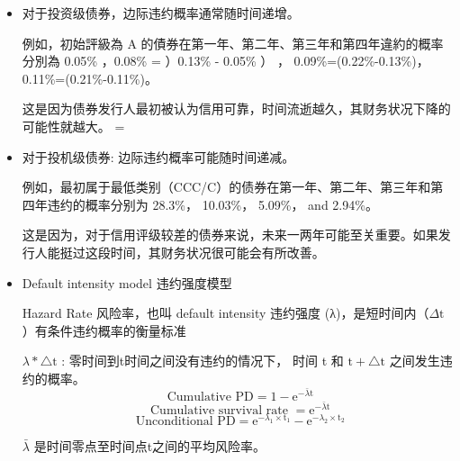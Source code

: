 \begin{itemize}
\begin{itemize}
\begin{itemize}
\begin{itemize}
            \item 计算 CCC/C 评级公司的前两年不违约的条件下，第三年违约的概率：
        
            \[ \text{前两年不违约的概率} = {100}\%  - {38.33}\%  = {61.67}\%\]
            \[ \text{第三年违约的概率} = {43.42}\%  - {38.33}\%  = {5.09}\%\]
            \[ Conditional PD = {5.09\%}/{61.67\%} = {8.25}\% \]
        \end{itemize}

        
    \item 对于投资级债券，边际违约概率通常随时间递增。
        
    例如，初始評級為 A 的債券在第一年、第二年、第三年和第四年違約的概率分別為 {0.05}\% ，{0.08}\%  = ）{0.13}\%  - {0.05}\% ） ， 0.09\%=(0.22\%-0.13\%)，  0.11\%=(0.21\%-0.11\%)。
        
       
    这是因为债券发行人最初被认为信用可靠，时间流逝越久，其财务状况下降的可能性就越大。    
=
        
    \item 对于投机级债券: 边际违约概率可能随时间递减。
        
    例如，最初属于最低类别（CCC/C）的债券在第一年、第二年、第三年和第四年违约的概率分别为 28.3\%， 10.03\%， 5.09\%， and 2.94\%。
        
    这是因为，对于信用评级较差的债券来说，未来一两年可能至关重要。如果发行人能挺过这段时间，其财务状况很可能会有所改善。
    
        
        \item Default intensity model 违约强度模型
        
        Hazard Rate 风险率，也叫 default intensity 违约强度 (λ)，是短时间内（\(\Delta \mathrm{t}\) ）有条件违约概率的衡量标准 
        
        \(\lambda  * \bigtriangleup \mathrm{t}\) : 零时间到t时间之间没有违约的情况下， 时间 t 和 \(\mathrm{t} + \bigtriangleup \mathrm{t}\) 之间发生违约的概率。
        \[\text{ Cumulative }\mathrm{{PD}} = 1 - {\mathrm{e}}^{-\bar{\lambda }\mathrm{t}}\]
        \[\text{ Cumulative survival rate } = {\mathrm{e}}^{-\bar{\lambda }\mathrm{t}}\]
        \[\text{ Unconditional }\mathrm{{PD}} = {\mathrm{e}}^{-{\lambda }_{1} \times  {\mathrm{t}}_{1}} - {\mathrm{e}}^{-{\lambda }_{2} \times  {\mathrm{t}}_{2}}\]
        
        \(\bar{\lambda }\) 是时间零点至时间点t之间的平均风险率。 
        

\end{itemize}
\end{itemize}
\end{itemize}
